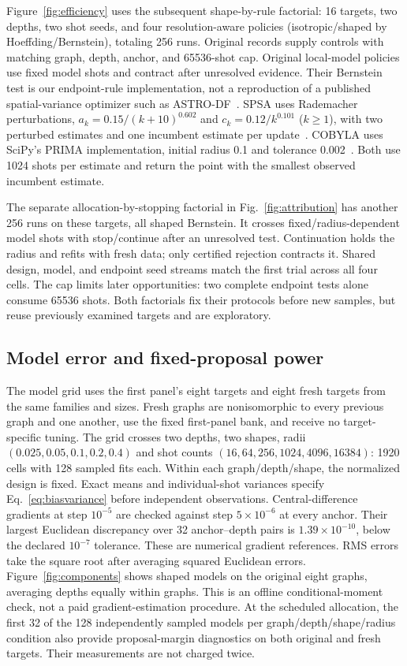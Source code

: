 \documentclass[11pt]{article}
\begin{document}
Figure~\ref{fig:efficiency} uses the subsequent shape-by-rule factorial:
16 targets, two depths, two shot seeds, and four resolution-aware policies
(isotropic/shaped by Hoeffding/Bernstein), totaling 256 runs. Original
records supply controls with matching graph, depth, anchor, and 65536-shot
cap. Original local-model policies use fixed model shots and contract after
unresolved evidence. Their Bernstein test is our endpoint-rule
implementation, not a reproduction of a published spatial-variance
optimizer such as ASTRO-DF~\cite{ha2024}. SPSA uses Rademacher perturbations,
$a_k=0.15/(k+10)^{0.602}$ and $c_k=0.12/k^{0.101}$ ($k\ge1$), with two perturbed
estimates and one incumbent estimate per update~\cite{spall1992}.
COBYLA uses SciPy's PRIMA implementation, initial radius 0.1 and tolerance
0.002~\cite{powell1994,zhang2023prima}. Both use 1024 shots per estimate
and return the point with the smallest observed incumbent estimate.

The separate allocation-by-stopping factorial in
Fig.~\ref{fig:attribution} has another 256 runs on these targets, all
shaped Bernstein. It crosses fixed/radius-dependent model shots with
stop/continue after an unresolved test. Continuation holds the radius and
refits with fresh data; only certified rejection contracts it. Shared
design, model, and endpoint seed streams match the first trial across
all four cells. The cap limits later opportunities: two complete endpoint
tests alone consume 65536 shots. Both factorials fix their protocols before
new samples, but reuse previously examined targets and are exploratory.

\subsection{Model error and fixed-proposal power}
The model grid uses the first panel's eight targets and eight fresh targets
from the same families and sizes. Fresh graphs are nonisomorphic to every
previous graph and one another, use the fixed first-panel bank, and receive
no target-specific tuning. The grid crosses two depths, two shapes, radii
$(0.025,0.05,0.1,0.2,0.4)$ and shot counts
$(16,64,256,1024,4096,16384)$: 1920 cells with 128 sampled fits each.
Within each graph/depth/shape, the normalized design is fixed. Exact means
and individual-shot variances specify Eq.~\eqref{eq:biasvariance} before
independent observations. Central-difference gradients at step $10^{-5}$ are checked against
step $5\times10^{-6}$ at every anchor. Their largest Euclidean discrepancy
over 32 anchor--depth pairs is $1.39\times10^{-10}$, below the declared
$10^{-7}$ tolerance. These are numerical gradient references. RMS errors take the square
root after averaging squared Euclidean errors. Figure~\ref{fig:components}
shows shaped models on the original eight graphs, averaging depths equally
within graphs. This is an offline conditional-moment check, not a paid
gradient-estimation procedure. At the scheduled allocation, the first 32 of the 128 independently sampled models per
graph/depth/shape/radius condition also provide proposal-margin diagnostics
on both original and fresh targets. Their measurements are not charged twice.
\end{document}
